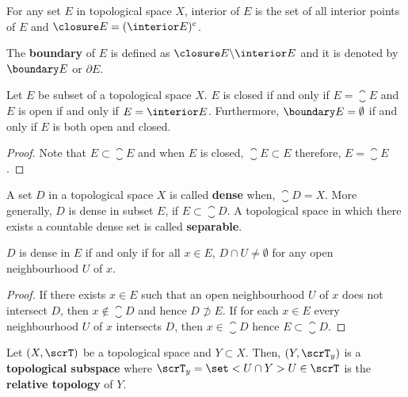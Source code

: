 \begin{proposition}
    For any set \(E\) in topological space \(X\), interior of  \(E\) is the set of all interior points of \(E\) and \(\closure E =( \interior E)^c\).
\end{proposition}

\begin{definition}
    The \textbf{boundary} of \(E\) is defined as \(\closure E \backslash \interior E\) and it is denoted by \(\boundary E\) or \(\partial E\).
\end{definition}

\begin{proposition}
    Let \(E\) be subset of a topological space \(X\). \(E\) is closed if and only if \(E = \closure E\) and \(E\) is open if and only if \(E = \interior E\). Furthermore, \(\boundary E = \emptyset\) if and only if \(E\) is both open and closed.
\end{proposition}

\begin{proof}
    Note that \(E \subset \closure E\) and when \(E\) is closed, \(\closure E \subset E\) therefore, \(E = \closure E\).
\end{proof}

\begin{definition}
    A set \(D\) in a topological space \(X\) is called \textbf{dense} when, \(\closure D = X\). More generally, \(D\) is dense in subset \(E\), if \(E \subset \closure D\). A topological space in which there exists a countable dense set is called \textbf{separable}.
\end{definition}

\begin{proposition}
    \(D\) is dense in \(E\) if and only if for all \(x \in E\), \(D \cap U \neq \emptyset\) for any open neighbourhood \(U\) of \(x\).
\end{proposition}

\begin{proof}
    If there exists \(x \in E\) such that an open neighbourhood \(U\) of \(x\) does not intersect \(D\), then \(x \notin \closure D\) and hence \(D \not\supset E\). If for each \(x \in E\) every neighbourhood \(U\) of \(x\) intersects \(D\), then \(x \in \closure D\) hence \(E \subset \closure D\).
\end{proof}

Let \((X,\scrT)\) be a topological space and \(Y \subset X\). Then, \((Y,\scrT_y)\) is a \textbf{topological subspace} where \(\scrT_y = \set<U \cap Y>{U \in \scrT}\) is the \textbf{relative topology} of \(Y\).

